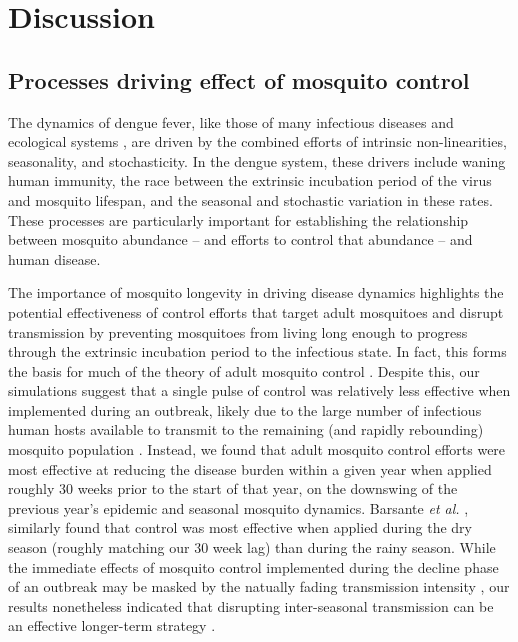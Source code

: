 \documentclass[10pt,letterpaper]{article}
\begin{document}
\section*{Discussion}

\subsection*{Processes driving effect of mosquito control}

The dynamics of dengue fever, like those of many infectious diseases \cite{Ellner1998,Koelle2004} and ecological systems \cite{Bjornstad2001}, are driven by the combined efforts of intrinsic non-linearities, seasonality, and stochasticity.
In the dengue system, these drivers include waning human immunity, the race between the extrinsic incubation period of the virus and mosquito lifespan, and the seasonal and stochastic variation in these rates.
These processes are particularly important for establishing the relationship between mosquito abundance -- and efforts to control that abundance -- and human disease.

The importance of mosquito longevity in driving disease dynamics highlights the potential effectiveness of control efforts that target adult mosquitoes and disrupt transmission by preventing mosquitoes from living long enough to progress through the extrinsic incubation period to the infectious state.
In fact, this forms the basis for much of the theory of adult mosquito control \cite{Burattini2008, Morrison2008, Smith2012}.
Despite this, our simulations suggest that a single pulse of control was relatively less effective when implemented during an outbreak, likely due to the large number of infectious human hosts available to transmit to the remaining (and rapidly rebounding) mosquito population \cite{Newton1992, Burattini2008}.
Instead, we found that adult mosquito control efforts were most effective at reducing the disease burden within a given year when applied roughly 30 weeks prior to the start of that year, on the downswing of the previous year's epidemic and seasonal mosquito dynamics.
Barsante \emph{et al.} \cite{Barsante2015}, similarly found that control was most effective when applied during the dry season (roughly matching our 30 week lag) than during the rainy season.
While the immediate effects of mosquito control implemented during the decline phase of an outbreak may be masked by the natually fading transmission intensity \cite{Stoddard2014}, our results nonetheless indicated that disrupting inter-seasonal transmission can be an effective longer-term strategy \cite{Hladish2018}.
\end{document}
